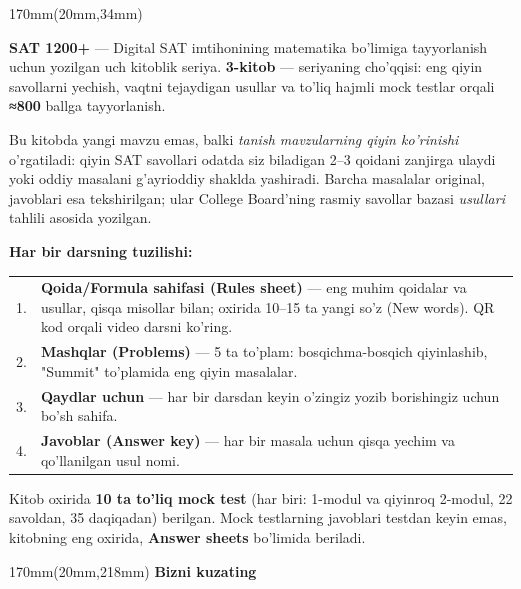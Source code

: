 \documentclass[a4paper]{article}
\begin{document}
\begin{textblock*}{170mm}(20mm,34mm)
{\fontsize{11}{16}\selectfont\color{ink}

\textbf{SAT 1200+} --- Digital SAT imtihonining matematika bo'limiga tayyorlanish uchun yozilgan uch kitoblik seriya. \textbf{3-kitob} --- seriyaning cho'qqisi: eng qiyin savollarni yechish, vaqtni tejaydigan usullar va to'liq hajmli mock testlar orqali \textbf{≈800} ballga tayyorlanish.

\vspace{4mm}
Bu kitobda yangi mavzu emas, balki \emph{tanish mavzularning qiyin ko'rinishi} o'rgatiladi: qiyin SAT savollari odatda siz biladigan 2--3 qoidani zanjirga ulaydi yoki oddiy masalani g'ayrioddiy shaklda yashiradi. Barcha masalalar original, javoblari esa tekshirilgan; ular College Board'ning rasmiy savollar bazasi \emph{usullari} tahlili asosida yozilgan.

\vspace{4mm}
\textbf{Har bir darsning tuzilishi:}

\vspace{2mm}
\begin{tabular}{@{}p{10mm}p{150mm}@{}}
1. & \textbf{Qoida/Formula sahifasi (Rules sheet)} --- eng muhim qoidalar va usullar, qisqa misollar bilan; oxirida 10--15 ta yangi so'z (New words). QR kod orqali video darsni ko'ring. \\[3mm]
2. & \textbf{Mashqlar (Problems)} --- 5 ta to'plam: bosqichma-bosqich qiyinlashib, "Summit" to'plamida eng qiyin masalalar. \\[3mm]
3. & \textbf{Qaydlar uchun} --- har bir darsdan keyin o'zingiz yozib borishingiz uchun bo'sh sahifa. \\[3mm]
4. & \textbf{Javoblar (Answer key)} --- har bir masala uchun qisqa yechim va qo'llanilgan usul nomi. \\
\end{tabular}

\vspace{4mm}
Kitob oxirida \textbf{10 ta to'liq mock test} (har biri: 1-modul va qiyinroq 2-modul, 22 savoldan, 35 daqiqadan) berilgan. Mock testlarning javoblari testdan keyin emas, kitobning eng oxirida, \textbf{Answer sheets} bo'limida beriladi.

}
\end{textblock*}

\begin{textblock*}{170mm}(20mm,218mm)
{\sffamily\bfseries\fontsize{11}{14}\selectfont\color{ink} Bizni kuzating}
\end{textblock*}
\end{document}
